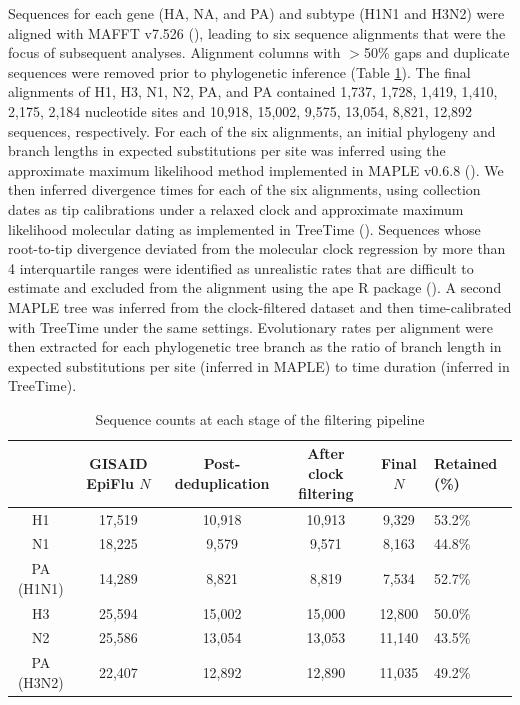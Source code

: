 \documentclass[11pt, a4paper]{article}
\begin{document}
Sequences for each gene (HA, NA, and PA) and subtype (H1N1 and H3N2) were aligned with MAFFT v7.526 (\cite{katoh_mafft_2013}), leading to six sequence alignments that were the focus of subsequent analyses.  Alignment columns with $>$50\% gaps and duplicate sequences were removed prior to phylogenetic inference (Table \ref{tab:sequences}). The final alignments of H1, H3, N1, N2, PA, and PA contained 1,737, 1,728, 1,419, 1,410, 2,175, 2,184 nucleotide sites and 10,918, 15,002, 9,575, 13,054, 8,821, 12,892 sequences, respectively. For each of the six alignments, an initial phylogeny and branch lengths in expected substitutions per site was inferred using the approximate maximum likelihood method implemented in MAPLE v0.6.8 (\cite{de_maio_maximum_2022}). We then inferred divergence times for each of the six alignments, using collection dates as tip calibrations under a relaxed clock and approximate maximum likelihood molecular dating as implemented in TreeTime (\cite{sagulenko_treetime_2018}). Sequences whose root-to-tip divergence deviated from the molecular clock regression by more than 4 interquartile ranges were identified as unrealistic rates that are difficult to estimate and excluded from the alignment using the ape R package (\cite{ape_2019}). A second MAPLE tree was inferred from the clock-filtered dataset and then time-calibrated with TreeTime under the same settings. Evolutionary rates per alignment were then extracted for each phylogenetic tree branch as the ratio of branch length in expected substitutions per site (inferred in MAPLE) to time duration (inferred in TreeTime).


\begin{table}[H]
    \centering
\caption{Sequence counts at each stage of the filtering pipeline}
\label{tab:sequences}
    \begin{tabular}{c|ccccl}\toprule
         \multicolumn{1}{c}{} &  GISAID EpiFlu $N$&  Post-deduplication&  After clock filtering& Final $N$ &Retained (\%)\\\midrule
         H1&  17,519&  10,918&  10,913&  9,329&53.2\%\\
         N1&  18,225&  9,579&  9,571&  8,163&44.8\%\\
         PA (H1N1)&  14,289&  8,821&  8,819&  7,534&52.7\%\\
         H3&  25,594&  15,002&  15,000&  12,800&50.0\%\\
         N2&  25,586&  13,054&  13,053&  11,140&43.5\%\\
         PA (H3N2)&  22,407&  12,892&  12,890&  11,035&49.2\%\\ \bottomrule
    \end{tabular}
    
    
\end{table}
\end{document}

